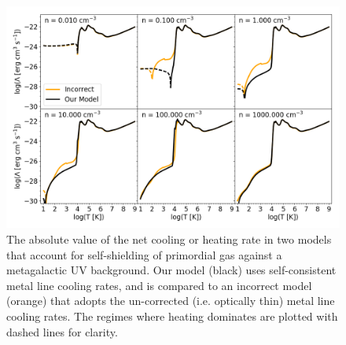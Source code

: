 \documentclass[twocolumn]{aastex61}
\begin{document}

\begin{figure}
\centering
\includegraphics[width=0.95\linewidth]{cooling_model_comparison}
\caption{The absolute value of the net cooling or heating rate in two models that account for self-shielding of primordial gas against a metagalactic UV background. Our model (black) uses self-consistent metal line cooling rates, and is compared to an incorrect model (orange) that adopts the un-corrected (i.e. optically thin) metal line cooling rates. The regimes where heating dominates are plotted with dashed lines for clarity.}
\label{fig:cooling comparison}
\end{figure}
\end{document}
